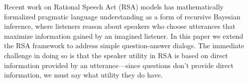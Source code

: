 \documentclass[10pt,letterpaper]{article}
\newcommand{\red}[1]{\textcolor{Red}{#1}}
\begin{document}



%

Recent work on Rational Speech Act (RSA) models \cite{frank2012, GoodmanStuhlmuller13_KnowledgeImplicature} has mathematically formalized pragmatic language understanding as a form of recursive Bayesian inference, where listeners reason about speakers who choose utterances that maximize information gained by an imagined listener.
In this paper we extend the RSA framework to address simple question-answer dialogs.
The immediate challenge in doing so is that the speaker utility in RSA is based on direct information provided by an utterance---since questions don't provide direct information, we must say what utility they do have. 
\end{document}
